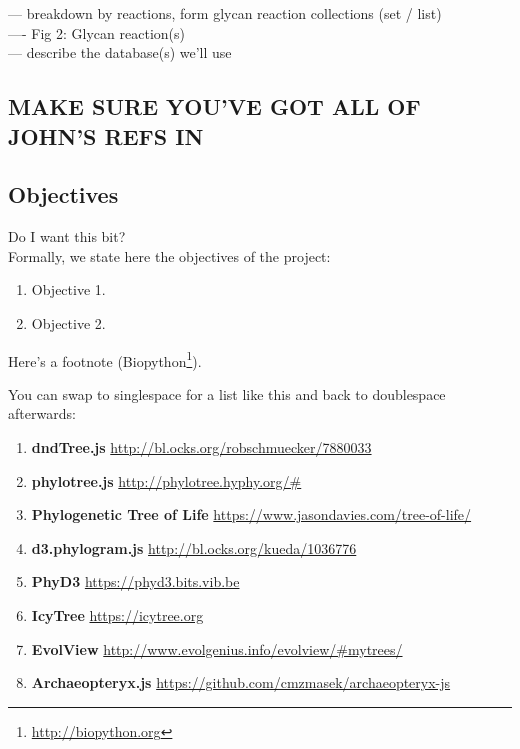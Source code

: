 \documentclass[12pt,a4paper]{article}
\begin{document}
--- breakdown by reactions, form glycan reaction collections (set / list)\\
---- Fig 2: Glycan reaction(s)\\
--- describe the database(s) we'll use\\






\subsection{MAKE SURE YOU'VE GOT ALL OF JOHN'S REFS IN}


















\subsection{Objectives}
\label{sec:objectives}
Do I want this bit?\\
Formally, we state here the objectives of the project:
\begin{enumerate}
\item Objective 1.
\item Objective 2.
\end{enumerate}

Here's a footnote (Biopython\footnote{\url{http://biopython.org}}).

You can swap to singlespace for a list like this and back to doublespace afterwards:

\singlespace
\begin{enumerate}
\item {\bf dndTree.js} \small \url{http://bl.ocks.org/robschmuecker/7880033} \normalsize
\item {\bf phylotree.js} \small \url{http://phylotree.hyphy.org/#} \normalsize
\item {\bf Phylogenetic Tree of Life} \small \url{https://www.jasondavies.com/tree-of-life/} \normalsize
\item {\bf d3.phylogram.js} \small \url{http://bl.ocks.org/kueda/1036776} \normalsize
\item {\bf PhyD3} \small \url{https://phyd3.bits.vib.be} \normalsize
\item {\bf IcyTree} \small \url{https://icytree.org} \normalsize
\item {\bf EvolView} \small \url{http://www.evolgenius.info/evolview/#mytrees/} \normalsize
\item {\bf Archaeopteryx.js} \small \url{https://github.com/cmzmasek/archaeopteryx-js} \normalsize
\end{enumerate}
\doublespace
\end{document}
